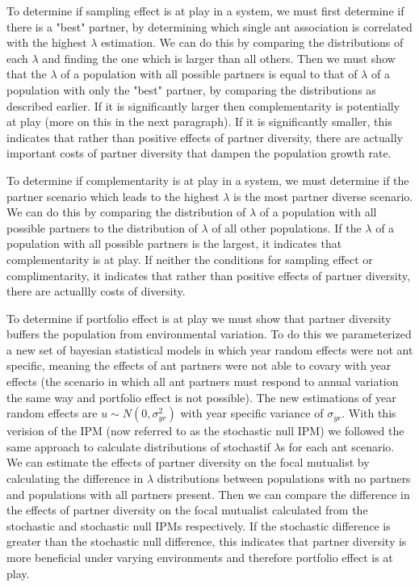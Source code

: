 \documentclass[11pt]{article}
\begin{document}
To determine if sampling effect is at play in a system, we must first determine if there is a "best" partner, by determining which single ant association is correlated with the highest $\lambda$ estimation.
We can do this by comparing the distributions of each $\lambda$ and finding the one which is larger than all others.
Then we must show that the $\lambda$ of a population with all possible partners is equal to that of $\lambda$ of a population with only the "best" partner, by comparing the distributions as described earlier.
If it is significantly larger then complementarity is potentially at play (more on this in the next paragraph).
If it is significantly smaller, this indicates that rather than positive effects of partner diversity, there are actually important costs of partner diversity that dampen the population growth rate.

To determine if complementarity is at play in a system, we must determine if the partner scenario which leads to the highest $\lambda$ is the most partner diverse scenario.
We can do this by comparing the distribution of $\lambda$ of a population with all possible partners to the distribution of $\lambda$ of all other populations.
If the $\lambda$ of a population with all possible partners is the largest, it indicates that complementarity is at play.
If neither the conditions for sampling effect or complimentarity, it indicates that rather than positive effects of partner diversity, there are actuallly costs of diversity.

To determine if portfolio effect is at play we must show that partner diversity buffers the population from environmental variation.
To do this we parameterized a new set of bayesian statistical models in which year random effects were not ant specific, meaning the effects of ant partners were not able to covary with year effects (the scenario in which all ant partners must respond to annual variation the same way and portfolio effect is not possible).
The new estimations of year random effects are $u \sim N(0,\sigma_{yr}^2)$ with year specific variance of $\sigma_{yr}$. 
With this verision of the IPM (now referred to as the stochastic null IPM) we followed the same approach to calculate distributions of stochastif $\lambda$s for each ant scenario.
We can estimate the effects of partner diversity on the focal mutualist by calculating the difference in $\lambda$ distributions between populations with no partners and populations with all partners present.
Then we can compare the difference in the effects of partner diversity on the focal mutualist calculated from the stochastic and stochastic null IPMs respectively.
If the stochastic difference is greater than the stochastic null difference, this indicates that  partner diversity is more beneficial under varying environments and therefore portfolio effect is at play.  
  
\end{document}
